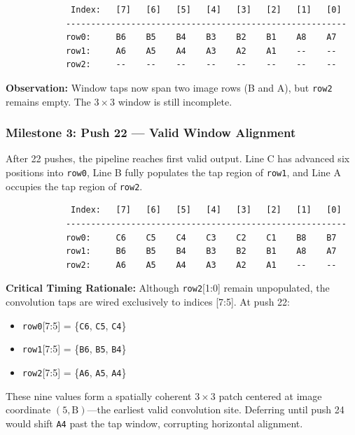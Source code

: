 \documentclass[11pt,a4paper]{report}
\begin{document}
\begin{verbatim}
             Index:   [7]   [6]   [5]   [4]   [3]   [2]   [1]   [0]
            --------------------------------------------------------
            row0:     B6    B5    B4    B3    B2    B1    A8    A7
            row1:     A6    A5    A4    A3    A2    A1    --    --
            row2:     --    --    --    --    --    --    --    --
\end{verbatim}

\textbf{Observation:} Window taps now span two image rows (B and A), but \texttt{row2} remains empty. The $3 \times 3$ window is still incomplete.

\subsubsection{Milestone 3: Push 22 --- Valid Window Alignment}

After 22 pushes, the pipeline reaches first valid output. Line C has advanced six positions into \texttt{row0}, Line B fully populates the tap region of \texttt{row1}, and Line A occupies the tap region of \texttt{row2}.

\begin{verbatim}
             Index:   [7]   [6]   [5]   [4]   [3]   [2]   [1]   [0]
            --------------------------------------------------------
            row0:     C6    C5    C4    C3    C2    C1    B8    B7
            row1:     B6    B5    B4    B3    B2    B1    A8    A7
            row2:     A6    A5    A4    A3    A2    A1    --    --
\end{verbatim}

\textbf{Critical Timing Rationale:} Although \texttt{row2}[1:0] remain unpopulated, the convolution taps are wired exclusively to indices [7:5]. At push 22:

\begin{itemize}[leftmargin=2em]
    \item \texttt{row0}[7:5] = \{\texttt{C6}, \texttt{C5}, \texttt{C4}\}
    \item \texttt{row1}[7:5] = \{\texttt{B6}, \texttt{B5}, \texttt{B4}\}
    \item \texttt{row2}[7:5] = \{\texttt{A6}, \texttt{A5}, \texttt{A4}\}
\end{itemize}

These nine values form a spatially coherent $3 \times 3$ patch centered at image coordinate $(5, \mathrm{B})$---the earliest valid convolution site. Deferring until push 24 would shift \texttt{A4} past the tap window, corrupting horizontal alignment.
\end{document}

